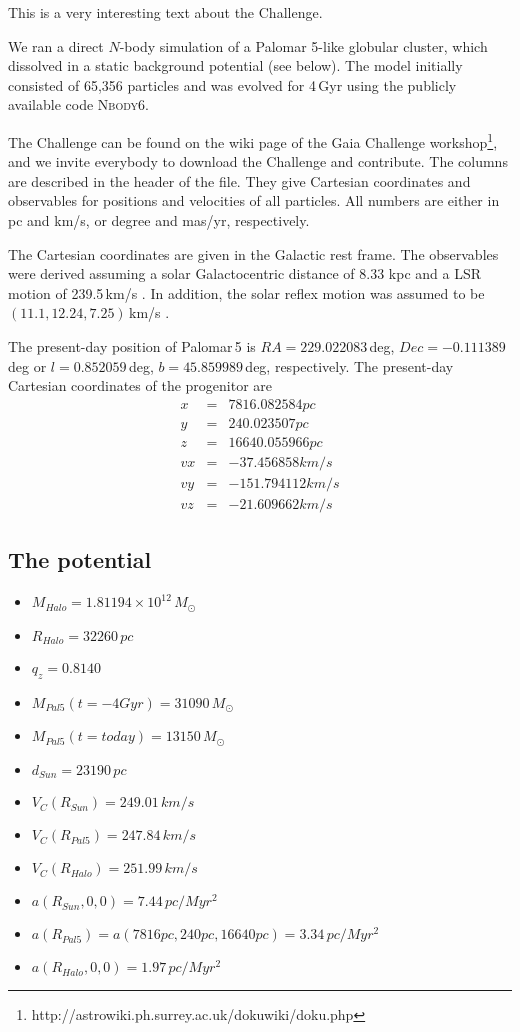 This is a very interesting text about the Challenge.

We ran a direct $N$-body simulation of a Palomar 5-like globular cluster, which dissolved in a static background potential (see below). The model initially consisted of 65,356 particles and was evolved for 4\,Gyr using the publicly available code \textsc{Nbody6}. 

The Challenge can be found on the wiki page of the Gaia Challenge workshop\footnote{http://astrowiki.ph.surrey.ac.uk/dokuwiki/doku.php}, and we invite everybody to download the Challenge and contribute. The columns are described in the header of the file. They give Cartesian coordinates and observables for positions and velocities of all particles. All numbers are either in pc and km/s, or degree and mas/yr, respectively. 

The Cartesian coordinates are given in the Galactic rest frame. The observables were derived assuming a solar Galactocentric distance of 8.33 kpc and a LSR motion of 239.5\,km/s \citep{Gillessen09}. In addition, the solar reflex motion was assumed to be $(11.1, 12.24, 7.25)$\,km/s \citep{Schonrich10}.  

The present-day position of Palomar\,5 is $RA = 229.022083$\,deg, $Dec = -0.111389$\,deg or $l = 0.852059$\,deg, $b = 45.859989$\,deg, respectively. The present-day Cartesian coordinates of the progenitor are 
\begin{eqnarray}
  x &=& 7816.082584 pc\\
  y &=& 240.023507 pc\\
  z &=& 16640.055966 pc\\
  vx &=& -37.456858 km/s\\
  vy &=& -151.794112 km/s\\
  vz &=& -21.609662 km/s
\end{eqnarray}


\subsection{The potential}

\begin{itemize}
  \item $M_{Halo} = 1.81194\times 10^{12}\,M_{\odot}$
  \item $R_{Halo} = 32260\,pc$
  \item $q_z = 0.8140$
  \item $M_{Pal5}(t=-4 Gyr) = 31090\,M_{\odot}$
  \item $M_{Pal5}(t=today) = 13150\,M_{\odot}$
  \item $d_{Sun} = 23190\,pc$
  \item $V_C(R_{Sun}) = 249.01\,km/s$
  \item $V_C(R_{Pal5}) = 247.84\,km/s$
  \item $V_C(R_{Halo}) = 251.99\,km/s$
  \item $a(R_{Sun}, 0, 0) = 7.44\,pc/Myr^2$
  \item $a(R_{Pal5}) = a(7816 pc, 240 pc, 16640 pc) = 3.34\,pc/Myr^2$
  \item $a(R_{Halo}, 0, 0) = 1.97\,pc/Myr^2$
\end{itemize}


